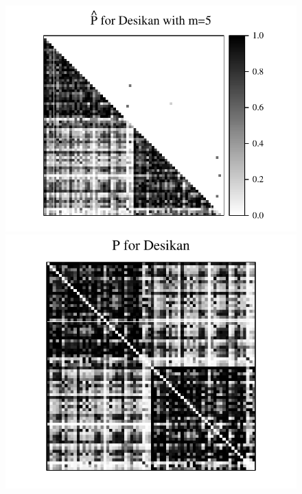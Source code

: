 \begin{figure}
\includegraphics[height=.205\textheight]{./Figures/Phat_desikan_m5.pdf}
\includegraphics[height=.2\textheight]{./Figures/P_desikan.pdf} \hspace{-35pt}

\end{figure}
